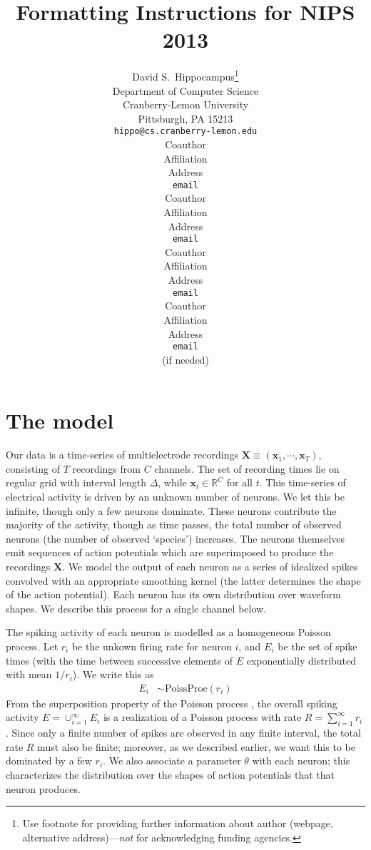 \documentclass{article} %
\title{Formatting Instructions for NIPS 2013}
\author{
David S.~Hippocampus\thanks{ Use footnote for providing further information
about author (webpage, alternative address)---\emph{not} for acknowledging
funding agencies.} \\
Department of Computer Science\\
Cranberry-Lemon University\\
Pittsburgh, PA 15213 \\
\texttt{hippo@cs.cranberry-lemon.edu} \\
\And
Coauthor \\
Affiliation \\
Address \\
\texttt{email} \\
\AND
Coauthor \\
Affiliation \\
Address \\
\texttt{email} \\
\And
Coauthor \\
Affiliation \\
Address \\
\texttt{email} \\
\And
Coauthor \\
Affiliation \\
Address \\
\texttt{email} \\
(if needed)\\
}
\newcommand{\bX}{\mathbf{X}}
\newcommand{\bx}{\mathbf{x}}
\begin{document}
\maketitle

\begin{abstract}
\end{abstract}

\section{The model}
Our data is a time-series of multielectrode recordings $\bX \equiv (\bx_1, \cdots, \bx_T)$, consisting of $T$ recordings from $C$ channels. 
The set of recording times lie on regular grid with interval length $\Delta$, while $\bx_t \in \mathbb{R}^C$ for all $t$. 
This time-series of electrical activity is driven by an unknown number of neurons. We let this be infinite, though only a few neurons dominate.
These neurons contribute the majority of the activity, though as time passes, the total number of observed neurons (the number of observed `species') increases. 
The neurons themselves emit sequences of action potentials which are superimposed to produce the recordings $\bX$. We model the output of each neuron as a
series of idealized spikes convolved with an appropriate smoothing kernel (the latter determines the shape of the action potential). Each neuron has its own 
distribution over waveform shapes. We describe this process for a single channel below.

The spiking activity of each neuron is modelled as a homogeneous Poisson process. Let $r_i$ be the unkown firing rate for neuron $i$, and 
$E_i$ be the set of spike times (with the time between successive elements of $E$ exponentially distributed with mean $1/r_i$). We write this as
\begin{align}
  E_i &\sim \text{PoissProc}(r_i)
\end{align}
From the superposition property of the Poisson process \citep{kingman93}, the overall spiking activity $E = \cup_{i=1}^{\infty} E_i$ is a realization of a 
Poisson process with rate $R = \sum_{i=1}^{\infty} r_i$.
Since only a finite number of spikes are observed in any finite interval, the total rate $R$ must also be finite; moreover, as we described earlier, we want this to
be dominated by a few $r_i$. We also associate a parameter $\theta$ with each neuron; this characterizes the distribution over the shapes of
action potentials that that neuron produces.
\end{document}
